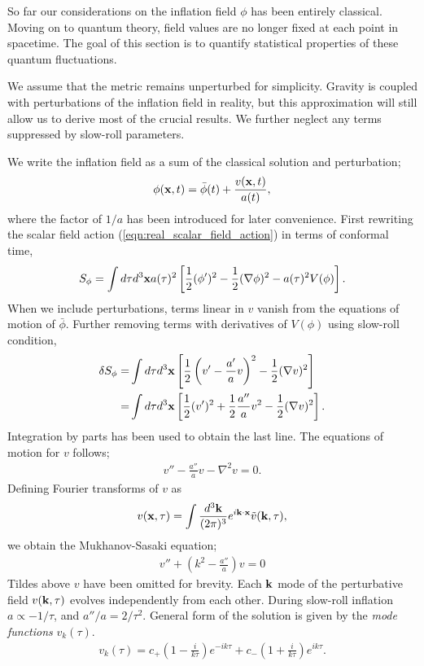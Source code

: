 So far our considerations on the inflation field $\phi$ has been entirely classical. Moving on to quantum theory, field values are no longer fixed at each point in spacetime. The goal of this section is to quantify statistical properties of these quantum fluctuations.

We assume that the metric remains unperturbed for simplicity. Gravity is coupled with perturbations of the inflation field in reality, but this approximation will still allow us to derive most of the crucial results. We further neglect any terms suppressed by slow-roll parameters.

We write the inflation field as a sum of the classical solution and perturbation;
\begin{align}
	\phi(\mathbf{x}, t) = \bar{\phi}(t) + \frac{v(\mathbf{x}, t)}{a(t)},	\label{eqn:inflation_perturbation_definition}
\end{align}
where the factor of $1/a$ has been introduced for later convenience. First rewriting the scalar field action (\ref{eqn:real_scalar_field_action}) in terms of conformal time,
\begin{align}
	S_\phi = \int d\tau d^3\mathbf{x} a(\tau)^2 \left[ \frac{1}{2} (\phi')^2 - \frac{1}{2}(\nabla\phi)^2 - a(\tau)^2 V(\phi) \right].
\end{align}
When we include perturbations, terms linear in $v$ vanish from the equations of motion of $\bar\phi$. Further removing terms with derivatives of $V(\phi)$ using slow-roll condition,
\begin{align}
	\delta S_\phi =& \int d\tau d^3\mathbf{x} \left[ \frac{1}{2} \left(v' - \frac{a'}{a}v \right)^2 - \frac{1}{2}(\nabla v)^2 \right]	\\
	=& \int d\tau d^3\mathbf{x} \left[ \frac{1}{2} (v')^2 + \frac{1}{2}\frac{a''}{a} v^2 - \frac{1}{2}(\nabla v)^2 \right].
\end{align}
Integration by parts has been used to obtain the last line. The equations of motion for $v$ follows;
\begin{align}
	v'' - \frac{a''}{a} v - \nabla^2 v = 0.
\end{align}
Defining Fourier transforms of $v$ as
\begin{align}
	v(\mathbf{x},\tau) = \int \frac{d^3 \mathbf{k}}{(2\pi)^3} e^{i\mathbf{k} \cdot \mathbf{x}} \tilde{v}(\mathbf{k},\tau),
\end{align}
we obtain the Mukhanov-Sasaki equation;
\begin{align}
	v'' + (k^2 - \frac{a''}{a})v = 0	\label{eqn:Mukhanov_Sasaki}
\end{align}
Tildes above $v$ have been omitted for brevity. Each $\mathbf{k}$ mode of the perturbative field $v(\mathbf{k},\tau)$ evolves independently from each other. During slow-roll inflation $a\propto-1/\tau$, and $a''/a = 2/\tau^2$. General form of the solution is given by the \textit{mode functions} $v_k(\tau)$.
\begin{align}
	v_k(\tau) = c_+ \left( 1 - \frac{i}{k\tau} \right) e^{-ik\tau} + c_- \left( 1 + \frac{i}{k\tau} \right) e^{ik\tau}.
\end{align}

